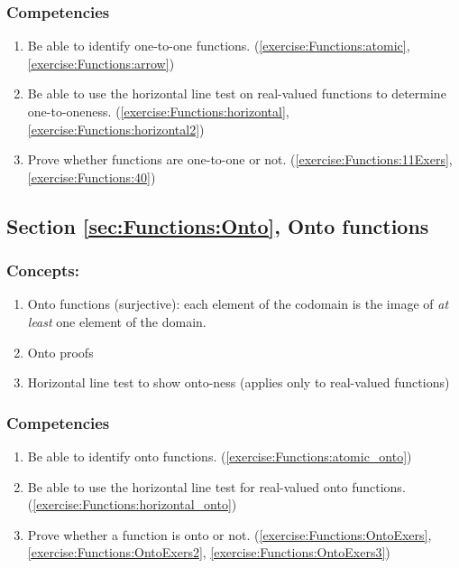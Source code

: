 \subsubsection*{Competencies}
\begin{enumerate}
\item
Be able to identify one-to-one functions.  (\ref{exercise:Functions:atomic}, \ref{exercise:Functions:arrow})
\item
Be able to use the horizontal line test on real-valued functions to determine one-to-oneness.  (\ref{exercise:Functions:horizontal}, \ref{exercise:Functions:horizontal2})
\item
Prove whether functions are one-to-one or not. (\ref{exercise:Functions:11Exers}, \ref{exercise:Functions:40})
\end{enumerate}


\subsection*{Section \ref{sec:Functions:Onto}, Onto functions}
\subsubsection*{Concepts:}
\begin{enumerate}
\item 
Onto functions (surjective): each element of the codomain is the image of \emph{at least} one element of the domain.
\item
Onto proofs
\item
Horizontal line test to show onto-ness (applies only to real-valued functions)
\end{enumerate}

\subsubsection*{Competencies}
\begin{enumerate}
\item
Be able to identify onto functions. (\ref{exercise:Functions:atomic_onto})
\item
Be able to use the horizontal line test for real-valued onto functions. (\ref{exercise:Functions:horizontal_onto})
\item
Prove whether a function is onto or not.  (\ref{exercise:Functions:OntoExers}, \ref{exercise:Functions:OntoExers2}, \ref{exercise:Functions:OntoExers3})
\end{enumerate}


